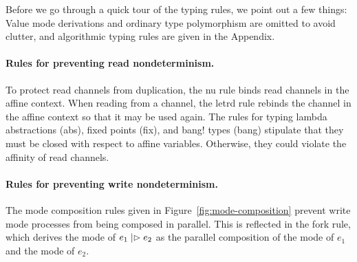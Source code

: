 \begin{comment}
To summarize, it maintains these invariants to ensure that \emph{well-typed ILC
programs are expressible as ITMs}:
\begin{itemize}[leftmargin=*]
  \item No duplication of read channel ends.
  \item No parallel composition of write mode processes.
\end{itemize}
\end{comment}

Before we go through a quick tour of the typing rules, we point out a few
things: Value mode derivations and ordinary type polymorphism are omitted to
avoid clutter, and algorithmic typing rules are given in the
Appendix.

\paragraph{Rules for preventing read nondeterminism.}
To protect read channels from duplication, the nu rule binds read channels in
the affine context. When reading from a channel, the letrd rule rebinds the
channel in the affine context so that it may be used again. The rules for typing
lambda abstractions (abs), fixed points (fix), and bang! types (bang) stipulate
that they must be closed with respect to affine variables. Otherwise, they could
violate the affinity of read channels.\smallskip

\paragraph{Rules for preventing write nondeterminism.}
The mode composition rules given in Figure~\ref{fig:mode-composition} prevent
write mode processes from being composed in parallel. This is reflected in the
fork rule, which derives the mode of $e_1 \mathrel{|\rhd} e_2$ as the parallel
composition of the mode of $e_1$ and the mode of $e_2$.


